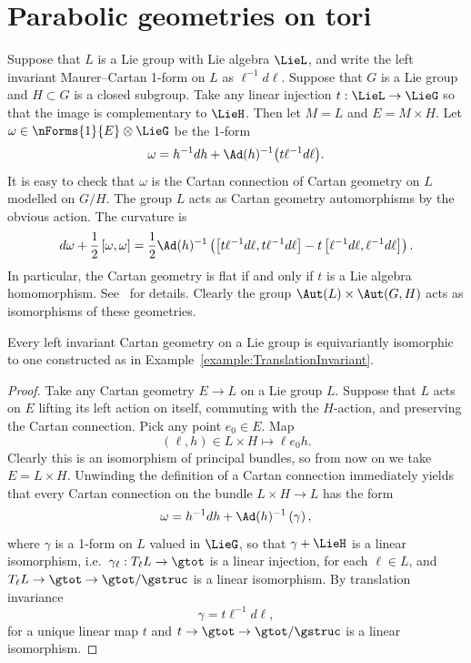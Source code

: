 \section{Parabolic geometries on tori}

\begin{example}\label{example:TranslationInvariant}
Suppose that $L$ is a Lie group with Lie algebra $\LieL$,
and write the left invariant Maurer--Cartan 1-form
on $L$ as $\ell^{-1}   d\ell$.
Suppose that $G$ is a Lie group and $H \subset G$
is a closed subgroup. Take any linear injection $t : \LieL \to \LieG$
so that the image is complementary to $\LieH$.
Then let $M=L$ and $E=M \times H$. Let $\omega \in \nForms{1}{E} \otimes  \LieG$
be the 1-form
\[
\omega = h^{-1}   dh + \Ad(h)^{-1}\big(t   \ell^{-1}   d\ell\big).
\]
It is easy to check that $\omega$ is the Cartan
connection of Cartan geometry on $L$ modelled on $G/H$.
The group $L$ acts as Cartan geometry automorphisms
by the obvious action. The curvature is
\[
d \omega + \frac{1}{2}\left[\omega,\omega\right]
=
\frac{1}{2}
\Ad(h)^{-1}\left(
\left[
t \ell^{-1}   d\ell,
t \ell^{-1}   d\ell
\right]
-
t
\left[
\ell^{-1}   d\ell,
\ell^{-1}   d\ell
\right]
\right).
\]
In particular, the Cartan geometry is f\/lat if and only if
$t$ is a Lie algebra homomorphism. See~\cite{Hammerl:2007}
for details. Clearly the group $\Aut(L) \times \Aut(G,H)$
acts as isomorphisms of these geometries.
\end{example}


\begin{lemma} Every left invariant Cartan geometry on a
Lie group is equivariantly isomorphic to one
constructed as in Example~{\rm \ref{example:TranslationInvariant}}.
\end{lemma}
\begin{proof}
Take any Cartan geometry $E \to L$ on a Lie group $L$.
Suppose that $L$ acts on $E$ lifting its left action
on itself, commuting with the $H$-action,
and preserving the Cartan connection.
Pick any point $e_0 \in E$. Map
\[
\left(\ell,h\right) \in L \times H \mapsto \ell e_0 h.
\]
Clearly this is an isomorphism of principal bundles,
so from now on we take $E=L \times H$.
Unwinding the def\/inition of a Cartan connection immediately yields
that every Cartan connection on the bundle $L \times H \to L$ has the form
\[
\omega = h^{-1}   dh + \Ad(h)^{-1} \left(\gamma\right),
\]
where $\gamma$ is a 1-form on $L$ valued in $\LieG$,
so that $\gamma+\LieH$ is a linear isomorphism,
i.e.\ $\gamma_{\ell} : T_{\ell} L \to \gtot$ is a
linear injection, for each $\ell \in L$, and
$T_{\ell} L \to \gtot \to \gtot/\gstruc$ is a linear isomorphism.
By translation invariance
\[
\gamma = t \ell^{-1}   d\ell,
\]
for a unique linear map $t$ and
$t \to \gtot \to \gtot/\gstruc$ is a linear isomorphism.
\end{proof}

